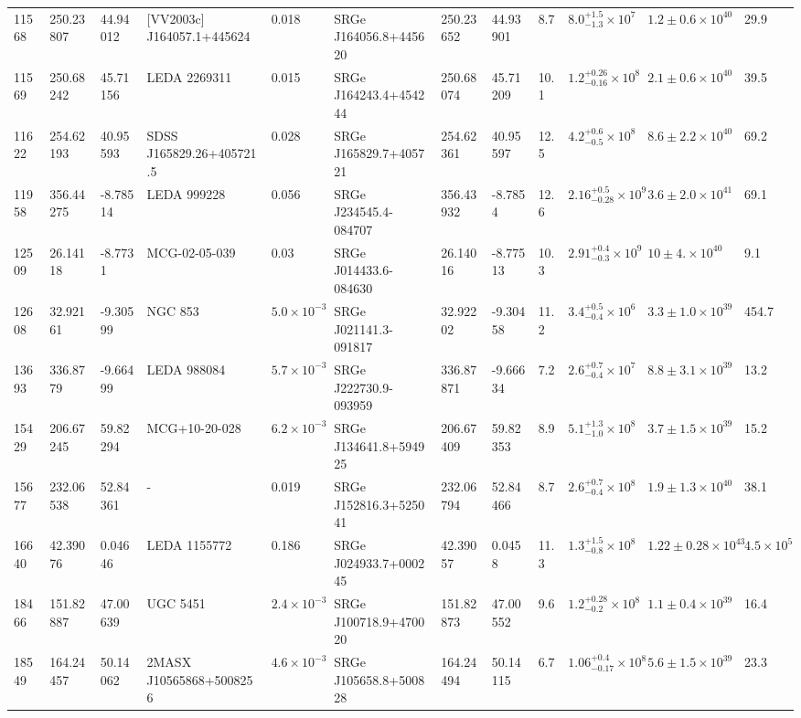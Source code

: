 \begin{longtable}{llllllllllll}
11568 & 250.23807 & 44.94012 & [VV2003c] J164057.1+445624 & 0.018 & SRGe J164056.8+445620 & 250.23652 & 44.93901 & 8.7 & $8.0^{+1.5}_{-1.3}\times10^{7}$ & $1.2\pm0.6\times10^{40}$ & 29.9 \\
11569 & 250.68242 & 45.71156 & LEDA 2269311 & 0.015 & SRGe J164243.4+454244 & 250.68074 & 45.71209 & 10.1 & $1.2^{+0.26}_{-0.16}\times10^{8}$ & $2.1\pm0.6\times10^{40}$ & 39.5 \\
11622 & 254.62193 & 40.95593 & SDSS J165829.26+405721.5 & 0.028 & SRGe J165829.7+405721 & 254.62361 & 40.95597 & 12.5 & $4.2^{+0.6}_{-0.5}\times10^{8}$ & $8.6\pm2.2\times10^{40}$ & 69.2 \\
11958 & 356.44275 & -8.78514 & LEDA  999228 & 0.056 & SRGe J234545.4-084707 & 356.43932 & -8.7854 & 12.6 & $2.16^{+0.5}_{-0.28}\times10^{9}$ & $3.6\pm2.0\times10^{41}$ & 69.1 \\
12509 & 26.14118 & -8.7731 & MCG-02-05-039 & 0.03 & SRGe J014433.6-084630 & 26.14016 & -8.77513 & 10.3 & $2.91^{+0.4}_{-0.3}\times10^{9}$ & $10\pm4.\times10^{40}$ & 9.1 \\
12608 & 32.92161 & -9.30599 & NGC   853 & $5.0\times10^{-3}$ & SRGe J021141.3-091817 & 32.92202 & -9.30458 & 11.2 & $3.4^{+0.5}_{-0.4}\times10^{6}$ & $3.3\pm1.0\times10^{39}$ & 454.7 \\
13693 & 336.8779 & -9.66499 & LEDA  988084 & $5.7\times10^{-3}$ & SRGe J222730.9-093959 & 336.87871 & -9.66634 & 7.2 & $2.6^{+0.7}_{-0.4}\times10^{7}$ & $8.8\pm3.1\times10^{39}$ & 13.2 \\
15429 & 206.67245 & 59.82294 & MCG+10-20-028 & $6.2\times10^{-3}$ & SRGe J134641.8+594925 & 206.67409 & 59.82353 & 8.9 & $5.1^{+1.3}_{-1.0}\times10^{8}$ & $3.7\pm1.5\times10^{39}$ & 15.2 \\
15677 & 232.06538 & 52.84361 & - & 0.019 & SRGe J152816.3+525041 & 232.06794 & 52.84466 & 8.7 & $2.6^{+0.7}_{-0.4}\times10^{8}$ & $1.9\pm1.3\times10^{40}$ & 38.1 \\
16640 & 42.39076 & 0.04646 & LEDA 1155772 & 0.186 & SRGe J024933.7+000245 & 42.39057 & 0.0458 & 11.3 & $1.3^{+1.5}_{-0.8}\times10^{8}$ & $1.22\pm0.28\times10^{43}$ & $4.5\times10^{5}$ \\
18466 & 151.82887 & 47.00639 & UGC  5451 & $2.4\times10^{-3}$ & SRGe J100718.9+470020 & 151.82873 & 47.00552 & 9.6 & $1.2^{+0.28}_{-0.2}\times10^{8}$ & $1.1\pm0.4\times10^{39}$ & 16.4 \\
18549 & 164.24457 & 50.14062 & 2MASX J10565868+5008256 & $4.6\times10^{-3}$ & SRGe J105658.8+500828 & 164.24494 & 50.14115 & 6.7 & $1.06^{+0.4}_{-0.17}\times10^{8}$ & $5.6\pm1.5\times10^{39}$ & 23.3 \\

\end{longtable}
